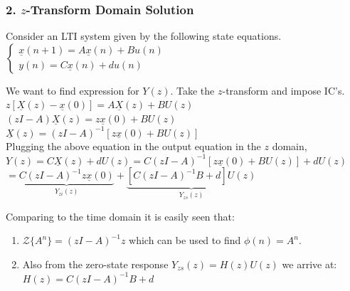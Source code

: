 \documentclass[mathserif, 10pt]{beamer} %
\def\x{\underline{x}}
\def\X{\underline{X}}
\begin{document}
\frame
{

\normalsize

\frametitle{2. $z$-Transform Domain Solution}

Consider an LTI system given by the following state equations. \\
  $\left\{
\begin{array}{l}
	\x(n+1) = A\x(n)+Bu(n)\\
	y(n) = C\x(n)+du(n)
\end{array} \right. $ %

We want to find expression for $Y(z)$.  Take the $z$-transform and impose IC's.\\ \vspace{.08in}
$z\left[\X(z)-\x(0)\right] = A\X(z) +BU(z)$\\
$(zI-A)\X(z) = z\x(0)+BU(z)$\\
$\X(z) = (zI-A)^{-1}[z\x(0)+BU(z)]$\\ \vspace{.1in}
Plugging the above equation in the output equation in the $z$ domain, \\ \vspace{.05in}
$Y(z) = C\X(z)+dU(z) = C(zI-A)^{-1}[z\x(0)+BU(z)]+dU(z)$\\
$=\underbrace{C(zI-A)^{-1}z\x(0)}_{Y_{zi}
(z)}+\underbrace{[C(zI-A)^{-1}B+d]U(z)}_{Y_{zs}(z)}$\\ \vspace{.1in}

Comparing to the time domain it is easily seen that:\\
\begin{enumerate}
	\item
$\mathcal{Z}\{A^n\} = (zI-A)^{-1}z$ which can be used to find $\phi(n) = A^n$. \\
\item Also from the zero-state response $Y_{zs}(z) = H(z)U(z)$ we arrive at:\\
$H(z) = C(zI-A)^{-1}B+d$


\end{enumerate}






}
\end{document}
